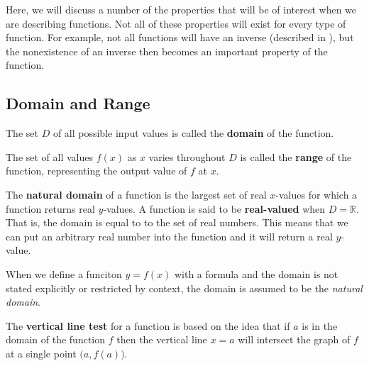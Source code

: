 Here, we will discuss a number of the properties that will be of interest when we are describing functions.
Not all of these properties will exist for every type of function.
For example, not all functions will have an inverse (described in ), but the nonexistence of an inverse then becomes an important property of the function. %

\subsection{Domain and Range}

\begin{defn}
    The set \(D\) of all possible input values is called the \textbf{domain} of the function.
\end{defn}

\begin{defn}
    The set of all values \(f(x)\) as \(x\) varies throughout \(D\) is called the \textbf{range} of the function,
    representing the output value of \(f\) at \(x\).
\end{defn}

 The \textbf{natural domain} of a function is the largest set of real \(x\)-values for which a function returns real \(y\)-values.
A function is said to be \textbf{real-valued} when \(D = \mathbb{R}\).
That is, the domain is equal to to the set of real numbers.
This means that we can put an arbitrary real number into the function and it will return a real $y$-value.

 \begin{remark}
     When we define a funciton \(y=f(x)\) with a formula and the domain is not stated explicitly or restricted by context, the domain is assumed to be the \emph{natural domain}.
   \end{remark}

  The \textbf{vertical line test} for a function is based on the idea that if \(a\) is in the domain of the function \(f\) then the vertical line \(x=a\) will intersect the graph of \(f\) at a single point \( \big(a,f(a)\big)\).


